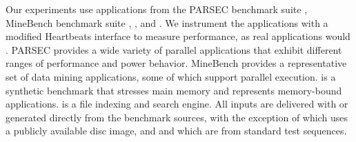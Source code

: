 Our experiments use applications from the PARSEC benchmark suite \cite{parsec}, MineBench benchmark suite \cite{minebench},  \cite{stream}, and  \cite{swish}.
We instrument the applications with a modified Heartbeats interface to measure performance, as real applications would \cite{icac2010heartbeats}.
PARSEC provides a wide variety of parallel applications that exhibit different ranges of performance and power behavior.
MineBench provides a representative set of data mining applications, some of which support parallel execution.
 is a synthetic benchmark that stresses main memory and represents memory-bound applications.
 is a file indexing and search engine.
All inputs are delivered with or generated directly from the benchmark sources, with the exception of  which uses a publicly available disc image, and  and  which are from standard test sequences.

